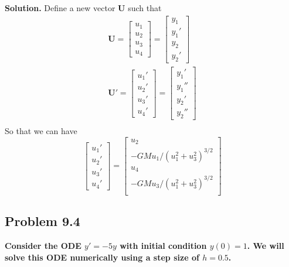 \textbf{Solution.} Define a new vector $\mathbf{U}$ such that
\begin{align*}
\mathbf{U} = 
\begin{bmatrix}
u_1\\
u_2\\
u_3\\
u_4
\end{bmatrix}
=
\begin{bmatrix}
y_1\\
y_1'\\
y_2\\
y_2'
\end{bmatrix}\\
\mathbf{U'} =
\begin{bmatrix}
u_1'\\
u_2'\\
u_3'\\
u_4'
\end{bmatrix} =
\begin{bmatrix}
y_1'\\
y_1''\\
y_2'\\
y_2''
\end{bmatrix}\\
\end{align*}
So that we can have
\begin{equation*}\boxed{
	\begin{bmatrix}
	u_1'\\
	u_2'\\
	u_3'\\
	u_4'
	\end{bmatrix} =
	\begin{bmatrix}
	u_2\\
	-GMu_1/\left(u_1^2+u_3^2\right)^{3/2}\\
	u_4\\
	-GMu_3/\left(u_1^2+u_3^2\right)^{3/2}\\
	\end{bmatrix}}
\end{equation*}

\subsection{Problem 9.4}
\textbf{Consider the ODE $y'=-5y$ with initial condition $y(0) = 1$. We will solve this ODE numerically using a step size of $h=0.5$.}
